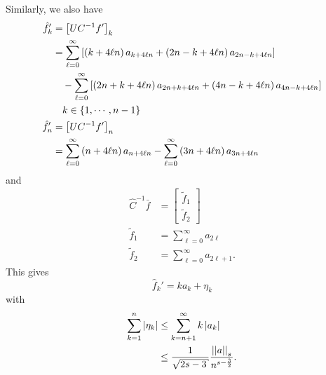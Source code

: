 Similarly, we also have
%
\begin{align}
    \hat{f}_{k}' &= \left[ UC^{-1}f' \right]_{k} \nonumber\\
    &= \sum_{\ell=0}^{\infty} \left[ 
        \left( k+4\ell n \right)a_{k+4\ell n} +
        \left( 2n-k+4\ell n \right)a_{2n-k+4\ell n} \right] \nonumber\\
        &\quad- \sum_{\ell=0}^{\infty}
        \left[ \left( 2n+k+4\ell n \right)a_{2n+k+4\ell n} +
        \left( 4n-k+4\ell n \right)a_{4n-k+4\ell n} \right] \nonumber\\
    &\quad k\in\left\{ 1,\cdots,n-1 \right\} \nonumber\\
    \hat{f}_{n}' &= \left[ UC^{-1}f' \right]_{n} \nonumber\\
    &= \sum_{\ell=0}^{\infty} \left( n+4\ell n \right)a_{n+4\ell n}
        - \sum_{\ell=0}^{\infty} \left( 3n+4\ell n \right)a_{3n+4\ell n}
\end{align}
%
and
%
\begin{align}
    \widehat{C}^{-1}\bar{f} &=
        \begin{bmatrix} \tilde{f}_{1} \\ \tilde{f}_{2}
            \end{bmatrix} \nonumber\\
        \tilde{f}_{1} &= \sum_{\ell=0}^{\infty} a_{2\ell} \nonumber\\
        \tilde{f}_{2} &= \sum_{\ell=0}^{\infty} a_{2\ell+1}.
\end{align}
%
This gives
%
\begin{equation}
    \hat{f}_{k}' = ka_{k} + \eta_{k}
    \label{eq:cvip_idct_fhat_prime}
\end{equation}
%
with
%
\begin{align}
    \sum_{k=1}^{n} \abs{\eta_{k}} &\le \sum_{k=n+1}^{\infty} k\abs{a_{k}}
        \nonumber\\
    &\le \frac{1}{\sqrt{2s-3}}\frac{\norm{a}_{s}}{n^{s-\frac{3}{2}}}.
    \label{eq:cvip_eta_sum}
\end{align}



